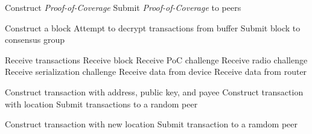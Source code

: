 \documentclass[10pt, nonatbib, nocopyrightspace, reprint]{sigplanconf}
\newenvironment{protocol}[2]{
  \begin{algorithm}[!htb]
    \DontPrintSemicolon
    \caption{#1}\label{#2}
}{
  \end{algorithm}
  \FloatBarrier
}
\begin{document}
\begin{protocol}{Miner Protocol Overview}{proto:miner}
  
   {
  	Construct \emph{Proof-of-Coverage}\;
  	Submit \emph{Proof-of-Coverage} to peers\;
  }

   {
    Construct a block\;
    Attempt to decrypt transactions from buffer\;
    Submit block to consensus group\;
  }

   {
    Receive transactions\;
    Receive block\;
    Receive PoC challenge\;
    Receive radio challenge\;
    Receive serialization challenge\;
    Receive data from device\;
    Receive data from router\;
  }

   {
    Construct transaction with address, public key, and payee\;
    Construct transaction with location\;
    Submit transactions to a random peer\;
  }

   {
    Construct transaction with new location\;
    Submit transaction to a ramdom peer\;
  }
\end{protocol}
\end{document}
